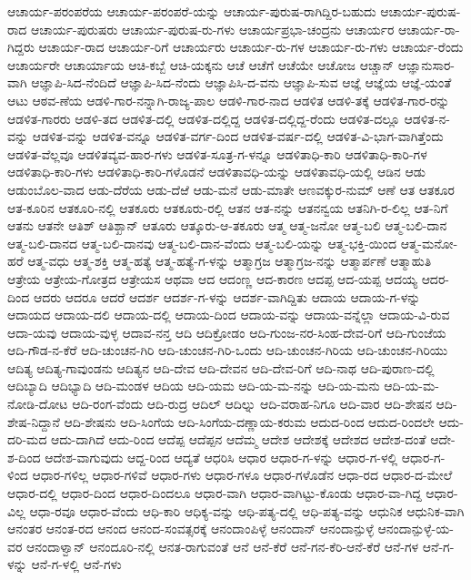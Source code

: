 ಆಚಾರ್ಯ-ಪರಂಪರೆಯ
ಆಚಾರ್ಯ-ಪರಂಪರೆ-ಯನ್ನು
ಆಚಾರ್ಯ-ಪುರುಷ-ರಾಗಿದ್ದಿರ-ಬಹುದು
ಆಚಾರ್ಯ-ಪುರುಷ-ರಾದ
ಆಚಾರ್ಯ-ಪುರುಷರು
ಆಚಾರ್ಯ-ಪುರುಷ-ರು-ಗಳು
ಆಚಾರ್ಯಪ್ರಭಾ-ಚಂದ್ರನು
ಆಚಾರ್ಯರ
ಆಚಾರ್ಯ-ರಾ-ಗಿದ್ದರು
ಆಚಾರ್ಯ-ರಾದ
ಆಚಾರ್ಯ-ರಿಗೆ
ಆಚಾರ್ಯರು
ಆಚಾರ್ಯ-ರು-ಗಳ
ಆಚಾರ್ಯ-ರು-ಗಳು
ಆಚಾರ್ಯ-ರೆಂದು
ಆಚಾರ್ಯರೇ
ಆಚಾರ್ಯಾಯ
ಆಚಿ-ಕಬ್ಬೆ
ಆಚಿ-ಯಕ್ಕನು
ಆಚೆ
ಆಚೆಗೆ
ಆಚೆಯೇ
ಆಚೋಜ
ಆಚ್ಚಾನ್
ಆಜ್ಞಾನುಸಾರ-ವಾಗಿ
ಆಜ್ಞಾಪಿ-ಸಿದ-ನೆಂದಿದೆ
ಆಜ್ಞಾಪಿ-ಸಿದ-ನೆಂದು
ಆಜ್ಞಾಪಿಸಿ-ದ-ವನು
ಆಜ್ಞಾಪಿ-ಸುವ
ಆಜ್ಞೆ
ಆಜ್ಞೆಯ
ಆಜ್ಞೆ-ಯಂತೆ
ಆಟು
ಆಠವ-ಣೆಯ
ಆಡಳಿ-ಗಾರ-ನನ್ನಾಗಿ-ರಾಜ್ಯ-ಪಾಲ
ಆಡಳಿ-ಗಾರ-ನಾದ
ಆಡಳಿತ
ಆಡಳಿ-ತಕ್ಕೆ
ಆಡಳಿತ-ಗಾರ-ರನ್ನು
ಆಡಳಿತ-ಗಾರರು
ಆಡಳಿ-ತದ
ಆಡಳಿತ-ದಲ್ಲಿ
ಆಡಳಿತ-ದಲ್ಲಿದ್ದ
ಆಡಳಿತ-ದಲ್ಲಿದ್ದ-ರೆಂದು
ಆಡಳಿತ-ದಲ್ಲೂ
ಆಡಳಿತ-ನ-ವನ್ನು
ಆಡಳಿತ-ವನ್ನು
ಆಡಳಿತ-ವನ್ನೂ
ಆಡಳಿತ-ವರ್ಗ-ದಿಂದ
ಆಡಳಿತ-ವರ್ಷ-ದಲ್ಲಿ
ಆಡಳಿತ-ವಿ-ಭಾಗ-ವಾಗಿತ್ತೆಂದು
ಆಡಳಿತ-ವೆಲ್ಲವೂ
ಆಡಳಿತವ್ಯವ-ಹಾರ-ಗಳು
ಆಡಳಿತ-ಸೂತ್ರ-ಗ-ಳನ್ನೂ
ಆಡಳಿತಾಧಿ-ಕಾರಿ
ಆಡಳಿತಾಧಿ-ಕಾರಿ-ಗಳ
ಆಡಳಿತಾಧಿ-ಕಾರಿ-ಗಳು
ಆಡಳಿತಾಧಿ-ಕಾರಿ-ಗಳೊಡನೆ
ಆಡಳಿತಾವಧಿ-ಯನ್ನು
ಆಡಳಿತಾವಧಿ-ಯಲ್ಲಿ
ಆಡಿನ
ಆಡು
ಆಡುಂಬೊಲ-ವಾದ
ಆಡು-ದೆರೆಯ
ಆಡು-ದೆಱೆ
ಆಡು-ಮನೆ
ಆಡು-ಮಾತೇ
ಆಣವಕ್ಕುರ-ನುಮ್
ಆಣೆ
ಆತ
ಆತಕೂರ
ಆತ-ಕೂರಿನ
ಆತಕೂರಿ-ನಲ್ಲಿ
ಆತಕೂರು
ಆತಕೂರು-ರಲ್ಲಿ
ಆತನ
ಆತ-ನನ್ನು
ಆತನನ್ವಯ
ಆತನಿಗಿ-ರ-ಲಿಲ್ಲ
ಆತ-ನಿಗೆ
ಆತನು
ಆತನೇ
ಆತಿಶ್
ಆತಿಶ್ಖಾನ್
ಆತೂರು
ಆತ್ಕೂರು-ಆ-ತಕೂರು
ಆತ್ಮ
ಆತ್ಮ-ಜನೋ
ಆತ್ಮ-ಬಲಿ
ಆತ್ಮ-ಬಲಿ-ದಾನ
ಆತ್ಮ-ಬಲಿ-ದಾನದ
ಆತ್ಮ-ಬಲಿ-ದಾನವು
ಆತ್ಮ-ಬಲಿ-ದಾನ-ವೆಂದು
ಆತ್ಮ-ಬಲಿ-ಯನ್ನು
ಆತ್ಮ-ಭಕ್ತಿ-ಯಿಂದ
ಆತ್ಮ-ಮನೋ-ಹರೆ
ಆತ್ಮ-ವಧು
ಆತ್ಮ-ಶಕ್ತಿ
ಆತ್ಮ-ಹತ್ಯೆ
ಆತ್ಮ-ಹತ್ಯೆ-ಗ-ಳನ್ನು
ಆತ್ಮಾಗ್ರಜ
ಆತ್ಮಾಗ್ರಜ-ನನ್ನು
ಆತ್ಮಾರ್ಪಣೆ
ಆತ್ಮಾಹುತಿ
ಆತ್ರೇಯ
ಆತ್ರೇಯ-ಗೋತ್ರದ
ಆತ್ರೇಯಸ
ಆಥವಾ
ಆದ
ಆದಂಣ್ಣ
ಆದ-ಕಾರಣ
ಆದಪ್ಪ
ಆದ-ಯಪ್ಪ
ಆದಯ್ಯ
ಆದರ-ದಿಂದ
ಆದರು
ಆದರೂ
ಆದರೆ
ಆದರ್ಶ
ಆದರ್ಶ-ಗ-ಳನ್ನು
ಆದರ್ಶ-ವಾಗಿದ್ದಿತು
ಆದಾಯ
ಆದಾಯ-ಗ-ಳನ್ನು
ಆದಾಯದ
ಆದಾಯ-ದಲಿ
ಆದಾಯ-ದಲ್ಲಿ
ಆದಾಯ-ದಿಂದ
ಆದಾಯ-ವನ್ನು
ಆದಾಯ-ವನ್ನೆಲ್ಲಾ
ಆದಾಯ-ವಿ-ರುವ
ಆದಾ-ಯವು
ಆದಾಯ-ವುಳ್ಳ
ಆದಾವ-ನನ್ತ
ಆದಿ
ಆದಿಕ್ರೋಡಂ
ಆದಿ-ಗುಂಜ-ನರ-ಸಿಂಹ-ದೇವ-ರಿಗೆ
ಆದಿ-ಗುಂಜೆಯ
ಆದಿ-ಗೌಡ-ನ-ಕೆರೆ
ಆದಿ-ಚುಂಚನ-ಗಿರಿ
ಆದಿ-ಚುಂಚನ-ಗಿರಿ-ಒಂದು
ಆದಿ-ಚುಂಚನ-ಗಿರಿಯ
ಆದಿ-ಚುಂಚನ-ಗಿರಿಯು
ಆದಿತ್ಯ
ಆದಿತ್ಯ-ಗಾವುಂಡನು
ಆದಿತ್ಯನ
ಆದಿ-ದೇವ
ಆದಿ-ದೇವನ
ಆದಿ-ದೇವ-ರಿಗೆ
ಆದಿ-ನಾಥ
ಆದಿ-ಪುರಾಣ-ದಲ್ಲಿ
ಆದಿಬ್ಯಾದಿ
ಆದಿಭ್ಯಾದಿ
ಆದಿ-ಮಂಡಳ
ಆದಿಯ
ಆದಿ-ಯಮ
ಆದಿ-ಯ-ಮ-ನನ್ನು
ಆದಿ-ಯ-ಮನು
ಆದಿ-ಯ-ಮ-ನೋಡಿ-ದೋಟ
ಆದಿ-ರಂಗ-ವೆಂದು
ಆದಿ-ರುದ್ರ
ಆದಿಲ್
ಆದಿಲ್ನು
ಆದಿ-ವರಾಹ-ನಿಗೂ
ಆದಿ-ವಾರ
ಆದಿ-ಶೇಷನ
ಆದಿ-ಶೇಷ-ನಿದ್ದಾನೆ
ಆದಿ-ಶೇಷನು
ಆದಿ-ಸಿಂಗೆಯ
ಆದಿ-ಸಿಂಗೆಯ-ದಣ್ಣಾಯ-ಕರುಮ
ಆದುದ-ರಿಂದ
ಆದುದ-ರಿಂದಲೇ
ಆದು-ದರಿ-ಮದ
ಆದು-ದಾಗಿದೆ
ಆದು-ರಿಂದ
ಆದೆಪ್ಪ
ಆದೆಪ್ಪನ
ಆದೆಮ್ಮ
ಆದೇಶ
ಆದೇಶಕ್ಕೆ
ಆದೇಶದ
ಆದೇಶ-ದಂತೆ
ಆದೇ-ಶ-ದಿಂದ
ಆದೇಶ-ವಾಗುವುದು
ಆದ್ದ-ರಿಂದ
ಆದ್ಯತೆ
ಆಧರಿಸಿ
ಆಧಾರ
ಆಧಾರ-ಗ-ಳನ್ನು
ಆಧಾರ-ಗ-ಳಲ್ಲಿ
ಆಧಾರ-ಗ-ಳಿಂದ
ಆಧಾರ-ಗಳಿಲ್ಲ
ಆಧಾರ-ಗಳಿವೆ
ಆಧಾರ-ಗಳು
ಆಧಾರ-ಗಳೂ
ಆಧಾರ-ಗಳೊಡೆನ
ಆಧಾ-ರದ
ಆಧಾರ-ದ-ಮೇಲೆ
ಆಧಾರ-ದಲ್ಲಿ
ಆಧಾರ-ದಿಂದ
ಆಧಾರ-ದಿಂದಲೂ
ಆಧಾರ-ವಾಗಿ
ಆಧಾರ-ವಾಗಿಟ್ಟು-ಕೊಂಡು
ಆಧಾರ-ವಾ-ಗಿದ್ದ
ಆಧಾರ-ವಿಲ್ಲ
ಆಧಾ-ರವೂ
ಆಧಾರ-ವೆಂದು
ಆಧಿ-ಕಾರಿ
ಆಧಿಕ್ಯ-ವನ್ನು
ಆಧಿ-ಪತ್ಯ-ದಲ್ಲಿ
ಆಧಿ-ಪತ್ಯ-ವನ್ನು
ಆಧುನಿಕ
ಆಧುನಿಕ-ವಾಗಿ
ಆನಂತರ
ಆನಂತ-ರದ
ಆನಂದ
ಆನಂದ-ಸಂವತ್ಸರಕ್ಕೆ
ಆನಂದಾಂಪಿಳ್ಳೆ
ಆನಂದಾನ್
ಆನಂದಾನ್ಪುಳ್ಳೆ
ಆನಂದಾನ್ಪುಳ್ಳೆ-ಯ-ವರ
ಆನಂದಾಳ್ವಾನ್
ಆನಂದೂರಿ-ನಲ್ಲಿ
ಆನತ-ರಾಗುವಂತೆ
ಆನೆ
ಆನೆ-ಕೆರೆ
ಆನೆ-ಗನ-ಕೆರಿ-ಆನೆ-ಕೆರೆ
ಆನೆ-ಗಳ
ಆನೆ-ಗ-ಳನ್ನು
ಆನೆ-ಗ-ಳಲ್ಲಿ
ಆನೆ-ಗಳು
